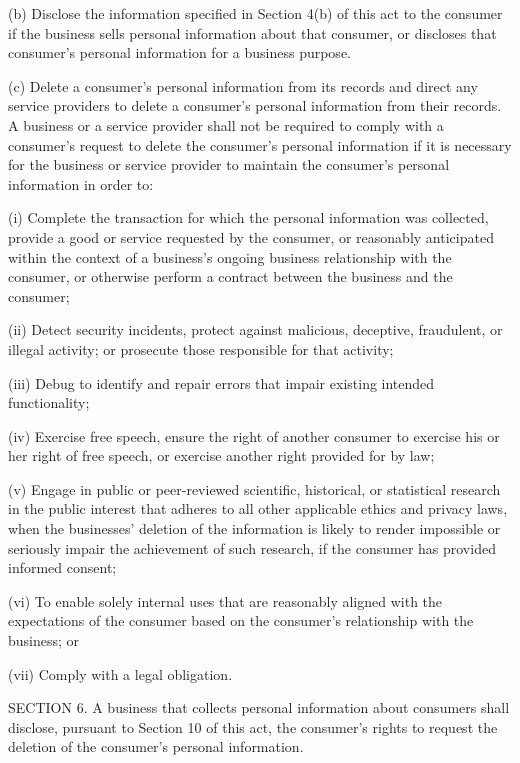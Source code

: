           (b)  Disclose the information specified in Section 4(b) of this act to the consumer if the business sells personal information about that consumer, or discloses that consumer's personal information for a business purpose.

          (c)  Delete a consumer's personal information from its records and direct any service providers to delete a consumer's personal information from their records.  A business or a service provider shall not be required to comply with a consumer's request to delete the consumer's personal information if it is necessary for the business or service provider to maintain the consumer's personal information in order to:

              (i)  Complete the transaction for which the personal information was collected, provide a good or service requested by the consumer, or reasonably anticipated within the context of a business's ongoing business relationship with the consumer, or otherwise perform a contract between the business and the consumer;

              (ii)  Detect security incidents, protect against malicious, deceptive, fraudulent, or illegal activity; or prosecute those responsible for that activity;

              (iii)  Debug to identify and repair errors that impair existing intended functionality;

              (iv)  Exercise free speech, ensure the right of another consumer to exercise his or her right of free speech, or exercise another right provided for by law;

              (v)  Engage in public or peer-reviewed scientific, historical, or statistical research in the public interest that adheres to all other applicable ethics and privacy laws, when the businesses' deletion of the information is likely to render impossible or seriously impair the achievement of such research, if the consumer has provided informed consent;

              (vi)  To enable solely internal uses that are reasonably aligned with the expectations of the consumer based on the consumer's relationship with the business; or

              (vii)  Comply with a legal obligation.

     SECTION 6.  A business that collects personal information about consumers shall disclose, pursuant to Section 10 of this act, the consumer's rights to request the deletion of the consumer's personal information.

